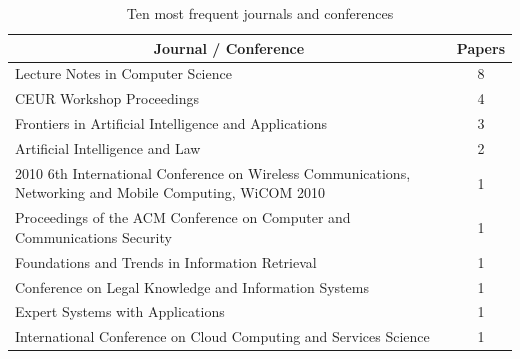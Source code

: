 
\begin{table}[H]
\footnotesize
    \centering
    \caption{Ten most frequent journals and conferences}
    \label{tab:rsl_freq_conferences}
\begin{tabular}{@{}p{14cm}c@{}}
\toprule
\multicolumn{1}{c}{\textbf{Journal / Conference}}                                                         & \textbf{Papers} \\ \midrule
Lecture Notes in Computer Science                                                                         & 8               \\
CEUR Workshop Proceedings                                                                                 & 4               \\
Frontiers in Artificial Intelligence and Applications                                                     & 3               \\
Artificial Intelligence and Law                                                                           & 2               \\
2010 6th International Conference on Wireless Communications, Networking and Mobile Computing, WiCOM 2010 & 1               \\
Proceedings of the ACM Conference on Computer and Communications Security                                 & 1               \\
Foundations and Trends in Information Retrieval                                                           & 1               \\
Conference on Legal Knowledge and Information Systems                                                     & 1               \\
Expert Systems with Applications                                                                          & 1               \\
International Conference on Cloud Computing and Services Science                                          & 1               \\ \bottomrule
\end{tabular}
\end{table}



